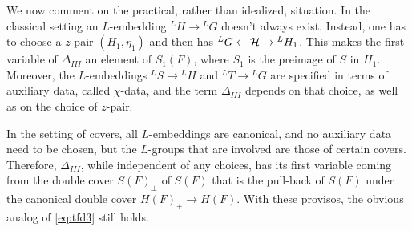 \documentclass{article}
\theoremstyle{definition}
\numberwithin{equation}{section}
\renewcommand{\-}{\hyp{}}
\begin{document}
We now comment on the practical, rather than idealized, situation. In the classical setting an $L$\-embedding $^LH \to {^LG}$ doesn't always exist. Instead, one has to choose a $z$-pair $(H_1,\eta_1)$ and then has $^LG \leftarrow \mathcal{H} \to {^LH_1}$. This makes the first variable of $\Delta_{III}$ an element of $S_1(F)$, where $S_1$ is the preimage of $S$ in $H_1$. Moreover, the $L$\-embeddings $^LS \to {^LH}$ and $^LT \to {^LG}$ are specified in terms of auxiliary data, called $\chi$-data, and the term $\Delta_{III}$ depends on that choice, as well as on the choice of $z$-pair.

In the setting of covers, all $L$\-embeddings are canonical, and no auxiliary data need to be chosen, but the $L$\-groups that are involved are those of certain covers. Therefore, $\Delta_{III}$, while independent of any choices, has its first variable coming from the double cover $S(F)_\pm$ of $S(F)$ that is the pull-back of $S(F)$ under the canonical double cover $H(F)_\pm \to H(F)$. With these provisos, the obvious analog of \eqref{eq:tfd3} still holds.




\end{document}
